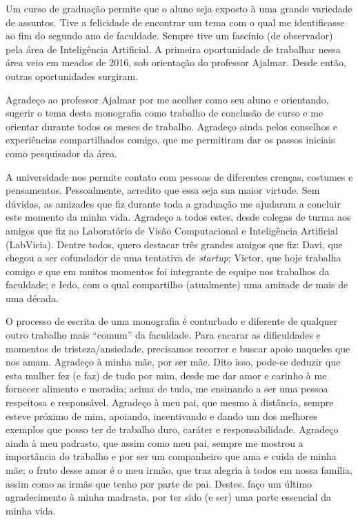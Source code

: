 \begin{agradecimentos}
Um curso de graduação permite que o aluno seja exposto à uma grande variedade de assuntos. Tive a felicidade de encontrar um tema com o qual me identificasse ao fim do segundo ano de faculdade. Sempre tive um fascínio (de observador) pela área de Inteligência Artificial. A primeira oportunidade de trabalhar nessa área veio em meados de 2016, sob orientação do professor Ajalmar. Desde então, outras oportunidades surgiram.

Agradeço ao professor Ajalmar por me acolher como seu aluno e orientando, sugerir o tema desta monografia como trabalho de conclusão de curso e me orientar durante todos os meses de trabalho. Agradeço ainda pelos conselhos e experiências compartilhados comigo, que me permitiram dar os passos iniciais como pesquisador da área.

A universidade nos permite contato com pessoas de diferentes crenças, costumes e pensamentos. Pessoalmente, acredito que essa seja sua maior virtude. Sem dúvidas, as amizades que fiz durante toda a graduação me ajudaram a concluir este momento da minha vida. Agradeço a todos estes, desde colegas de turma aos amigos que fiz no Laboratório de Visão Computacional e Inteligência Artificial (LabVicia). Dentre todos, quero destacar três grandes amigos que fiz: Davi, que chegou a ser cofundador de uma tentativa de \textit{startup}; Victor, que hoje trabalha comigo e que em muitos momentos foi integrante de equipe nos trabalhos da faculdade; e Iedo, com o qual compartilho (atualmente) uma amizade de mais de uma década.

O processo de escrita de uma monografia é conturbado e diferente de qualquer outro trabalho mais ``comum'' da faculdade. Para encarar as dificuldades e momentos de tristeza/ansiedade, precisamos recorrer e buscar apoio naqueles que nos amam. Agradeço à minha mãe, por ser mãe. Dito isso, pode-se deduzir que esta mulher fez (e faz) de tudo por mim, desde me dar amor e carinho à me fornecer alimento e moradia; acima de tudo, me ensinando a ser uma pessoa respeitosa e responsável. Agradeço à meu pai, que mesmo à distância, sempre esteve próximo de mim, apoiando, incentivando e dando um dos melhores exemplos que posso ter de trabalho duro, caráter e responsabilidade. Agradeço ainda à meu padrasto, que assim como meu pai, sempre me mostrou a importância do trabalho e por ser um companheiro que ama e cuida de minha mãe; o fruto desse amor é o meu irmão, que traz alegria à todos em nossa família, assim como as irmãs que tenho por parte de pai. Destes, faço um último agradecimento à minha madrasta, por ter sido (e ser) uma parte essencial da minha vida.


\end{agradecimentos}
